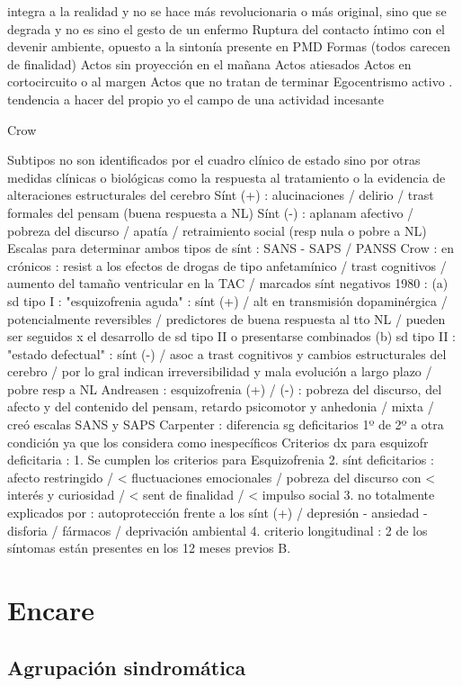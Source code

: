 \documentclass{scrbook}
\begin{document}
integra a la realidad y no se hace más revolucionaria o más original, sino que se degrada y no es sino el gesto de un enfermo Ruptura del contacto íntimo con el devenir ambiente, opuesto a la sintonía presente en PMD Formas (todos carecen de finalidad) Actos sin proyección en el mañana Actos atiesados Actos en cortocircuito o al margen Actos que no tratan de terminar Egocentrismo activo . tendencia a hacer del propio yo el campo de una actividad incesante

Crow

Subtipos no son identificados por el cuadro clínico de estado sino por otras medidas clínicas o biológicas como la respuesta al tratamiento o la evidencia de alteraciones estructurales del cerebro Sínt (+) : alucinaciones / delirio / trast formales del pensam (buena respuesta a NL) Sínt (-) : aplanam afectivo / pobreza del discurso / apatía / retraimiento social (resp nula o pobre a NL) Escalas para determinar ambos tipos de sínt : SANS - SAPS / PANSS Crow : en crónicos : resist a los efectos de drogas de tipo anfetamínico / trast cognitivos / aumento del tamaño ventricular en la TAC / marcados sínt negativos 1980 : (a) sd tipo I : "esquizofrenia aguda" : sínt (+) / alt en transmisión dopaminérgica / potencialmente reversibles / predictores de buena respuesta al tto NL / pueden ser seguidos x el desarrollo de sd tipo II o presentarse combinados (b) sd tipo II : "estado defectual" : sínt (-) / asoc a trast cognitivos y cambios estructurales del cerebro / por lo gral indican irreversibilidad y mala evolución a largo plazo / pobre resp a NL Andreasen : esquizofrenia (+) / (-) : pobreza del discurso, del afecto y del contenido del pensam, retardo psicomotor y anhedonia / mixta / creó escalas SANS y SAPS Carpenter : diferencia sg deficitarios 1º de 2º a otra condición ya que los considera como inespecíficos Criterios dx para esquizofr deficitaria : 1. Se cumplen los criterios para Esquizofrenia 2. sínt deficitarios : afecto restringido / < fluctuaciones emocionales / pobreza del discurso con < interés y curiosidad / < sent de finalidad / < impulso social 3. no totalmente explicados por : autoprotección frente a los sínt (+) / depresión - ansiedad - disforia / fármacos / deprivación ambiental 4. criterio longitudinal : 2 de los síntomas están presentes en los 12 meses previos B.
\section*{Encare}
\subsection*{Agrupación sindromática}
\end{document}
